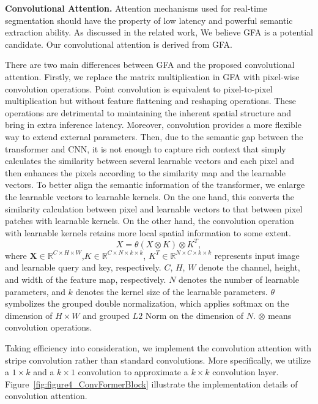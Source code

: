 \documentclass[letterpaper]{article} %
\begin{document}
\noindent
{\bf Convolutional Attention.}
Attention mechanisms used for real-time segmentation should have the property of low latency and powerful semantic extraction ability. As discussed in the related work, We believe GFA is a potential candidate. Our convolutional attention is derived from GFA.

There are two main differences between GFA and the proposed convolutional attention.
Firstly, we replace the matrix multiplication in GFA with pixel-wise convolution operations. Point convolution is equivalent to pixel-to-pixel multiplication but without feature flattening and reshaping operations. These operations are detrimental to maintaining the inherent spatial structure and bring in extra inference latency. Moreover, convolution provides a more flexible way to extend external parameters.
Then, due to the semantic gap between the transformer and CNN, it is not enough to capture rich context that simply calculates the similarity between several learnable vectors and each pixel and then enhances the pixels according to the similarity map and the learnable vectors. To better align the semantic information of the transformer, we enlarge the learnable vectors to learnable kernels. On the one hand, this converts the similarity calculation between pixel and learnable vectors to that between pixel patches with learnable kernels. On the other hand, the convolution operation with learnable kernels retains more local spatial information to some extent.
\begin{equation}\label{Eq:Conv-Former Attention}
X = \theta \left(X \otimes K\right) \otimes K^{T},
\end{equation}
%
where $\mathbf{X}\in\mathbb{R}^{C \times H \times W}$,$K \in \mathbb{R}^{C \times N \times k \times k}$, $K^{T} \in \mathbb{R}^{N \times C \times k \times k}$ represents input image and learnable query and key, respectively. $C$, $H$, $W$ denote the channel, height, and width of the feature map, respectively. $N$ denotes the number of learnable parameters, and $k$ denotes the kernel size of the learnable parameters. $\theta$ symbolizes the grouped double normalization, which applies softmax on the dimension of $H \times W$ and grouped $L2$ Norm on the dimension of $N$. $\otimes$ means convolution operations.

Taking efficiency into consideration, we implement the convolution attention with stripe convolution rather than standard convolutions. More specifically, we utilize a $1 \times k$ and a $k \times 1$ convolution to approximate a $k \times k$ convolution layer. Figure~\ref{fig:figure4_ConvFormerBlock} illustrate the implementation details of convolution attention.
\end{document}
